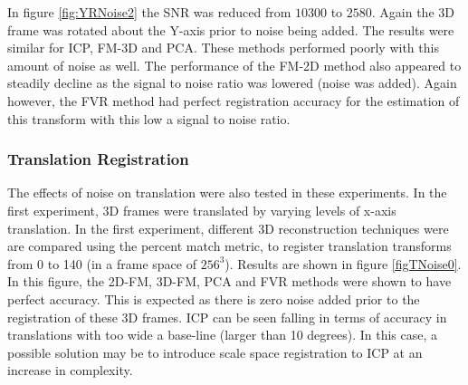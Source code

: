In figure \ref{fig:YRNoise2} the SNR was reduced from $10300$ to $2580$. Again the 3D frame was rotated about the Y-axis prior to noise being added. The results were similar for ICP, FM-3D and PCA. These methods performed poorly with this amount of noise as well. The performance of the FM-2D method also appeared to steadily decline as the signal to noise ratio was lowered (noise was added). Again however, the FVR method had perfect registration accuracy for the estimation of this transform with this low a signal to noise ratio. \\

\subsubsection{Translation Registration}

The effects of noise on translation were also tested in these experiments. In the first experiment, 3D frames were translated by varying levels of x-axis translation. In the first experiment, different 3D reconstruction techniques were are compared using the percent match metric, to register translation transforms from 0 to 140 (in a frame space of $256^3$). Results are shown in figure \ref{figTNoise0}. In this figure, the 2D-FM, 3D-FM, PCA and FVR methods were shown to have perfect accuracy. This is expected as there is zero noise added prior to the registration of these 3D frames. ICP can be seen falling in terms of accuracy in translations with too wide a base-line (larger than 10 degrees). In this case, a possible solution may be to introduce scale space registration to ICP at an increase in complexity. \\  

\begin{table}[!htb]
\centering
{}
\\
\caption{Average percent matched registration results for data rotated about the y-axis under varying noise conditions.}
\label{table:YRNoiseT}
\end{table}


